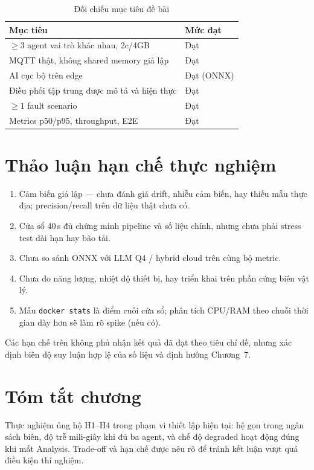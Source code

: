 \documentclass[12pt,a4paper,oneside]{report}
\newcommand{\code}[1]{\texttt{#1}}
\begin{document}
\begin{table}[htbp]
  \centering
  \caption{Đối chiếu mục tiêu đề bài}
  \label{tab:doi-chieu}
  \begin{tabular}{p{8.5cm}l}
    \toprule
    \textbf{Mục tiêu} & \textbf{Mức đạt} \\
    \midrule
    $\geq 3$ agent vai trò khác nhau, 2c/4GB & Đạt \\
    MQTT thật, không shared memory giả lập & Đạt \\
    AI cục bộ trên edge & Đạt (ONNX) \\
    Điều phối tập trung được mô tả và hiện thực & Đạt \\
    $\geq 1$ fault scenario & Đạt \\
    Metrics p50/p95, throughput, E2E & Đạt \\
    \bottomrule
  \end{tabular}
\end{table}

\section{Thảo luận hạn chế thực nghiệm}

\begin{enumerate}
  \item Cảm biến giả lập --- chưa đánh giá drift, nhiễu cảm biến, hay thiếu mẫu thực địa; precision/recall trên dữ liệu thật chưa có.
  \item Cửa sổ 40\,s đủ chứng minh pipeline và số liệu chính, nhưng chưa phải stress test dài hạn hay bão tải.
  \item Chưa so sánh ONNX với LLM Q4 / hybrid cloud trên cùng bộ metric.
  \item Chưa đo năng lượng, nhiệt độ thiết bị, hay triển khai trên phần cứng biên vật lý.
  \item Mẫu \code{docker stats} là điểm cuối cửa sổ; phân tích CPU/RAM theo chuỗi thời gian dày hơn sẽ làm rõ spike (nếu có).
\end{enumerate}

Các hạn chế trên không phủ nhận kết quả đã đạt theo tiêu chí đề, nhưng xác định biên độ suy luận hợp lệ của số liệu và định hướng Chương~7.

\section{Tóm tắt chương}

Thực nghiệm ủng hộ H1--H4 trong phạm vi thiết lập hiện tại: hệ gọn trong ngân sách biên, độ trễ mili-giây khi đủ ba agent, và chế độ degraded hoạt động đúng khi mất Analysis. Trade-off và hạn chế được nêu rõ để tránh kết luận vượt quá điều kiện thí nghiệm.
\end{document}
